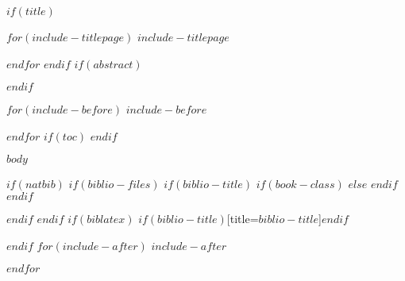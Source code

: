 \documentclass[ openright,titlepage,fleqn,numbers=noenddot,headinclude,
                10pt,a4paper,footinclude,cleardoublepage=empty,
                ]{scrreprt}
\author{%
   \authsf  $for(author)$$author$$sep$ \\ $endfor$ \\
    Klinisches Krebsregister \\
    \vspace{20pt} 
   \authsf  \@date 
    }
\begin{document}
$if(title)$

$for(include-titlepage)$
$include-titlepage$

$endfor$
%
\cleardoublepage
$endif$
$if(abstract)$
\begin{abstract}
$abstract$
\end{abstract}
$endif$

$for(include-before)$
$include-before$

$endfor$
$if(toc)$
{
\hypersetup{linkcolor=black}
\setcounter{tocdepth}{$toc-depth$}
\tableofcontents
\cleardoublepage
}
$endif$

\pagestyle{scrheadings}

\clearscrheadfoot
\ohead{{\headmark}}
\cfoot{{\pagemark}}

$body$

$if(natbib)$
$if(biblio-files)$
$if(biblio-title)$
$if(book-class)$
\renewcommand\bibname{$biblio-title$}
$else$
\renewcommand\refname{$biblio-title$}
$endif$
$endif$


$endif$
$endif$
$if(biblatex)$
\printbibliography$if(biblio-title)$[title=$biblio-title$]$endif$

$endif$
$for(include-after)$
$include-after$

$endfor$
\end{document}
